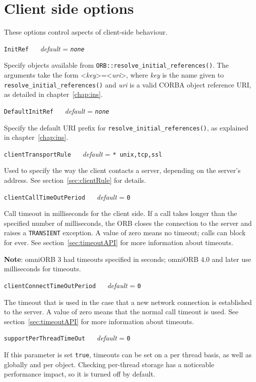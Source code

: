 \documentclass[11pt,oneside,a4paper]{book}
\makeatletter
\newcommand{\code}[1]{\texttt{#1}}
\newcommand{\op}[1]{\texttt{#1()}}
\newcommand{\confopt}[2]
  {\vspace{\baselineskip}\par\noindent\code{#1} ~~ \textit{default} =
   \code{#2}}
\renewcommand{\confopt}[2]
  {\vspace{\baselineskip}\par\noindent\code{#1} ~~ \textit{default} =
   \code{#2}\\[-1ex]\@afterheading}
\newcommand{\dsc}{\discretionary{}{}{}}
\makeatother
\begin{document}
\section{Client side options}
\label{sec:clientconf}

These options control aspects of client-side behaviour.


\confopt{InitRef}{\textit{none}}

Specify objects available from
\op{ORB::resolve\_initial\_references}. The arguments take the form
<\textit{key}>=<\textit{uri}>, where \textit{key} is the name given to
\op{resolve\_\dsc{}initial\_\dsc{}references} and \textit{uri} is a
valid CORBA object reference URI, as detailed in
chapter~\ref{chap:ins}.


\confopt{DefaultInitRef}{\textit{none}}

Specify the default URI prefix for
\op{resolve\_\dsc{}initial\_\dsc{}references}, as explained in
chapter~\ref{chap:ins}.


\confopt{clientTransportRule}{* unix,tcp,ssl}

Used to specify the way the client contacts a server, depending on the
server's address. See section~\ref{sec:clientRule} for details.


\confopt{clientCallTimeOutPeriod}{0}

Call timeout in milliseconds for the client side. If a call takes
longer than the specified number of milliseconds, the ORB closes the
connection to the server and raises a \code{TRANSIENT} exception. A
value of zero means no timeout; calls can block for ever. See
section~\ref{sec:timeoutAPI} for more information about timeouts.

\vspace{.5\baselineskip}

\noindent\textbf{Note}: omniORB 3 had timeouts specified in seconds;
omniORB 4.0 and later use milliseconds for timeouts.


\confopt{clientConnectTimeOutPeriod}{0}

The timeout that is used in the case that a new network connection is
established to the server. A value of zero means that the normal call
timeout is used. See section~\ref{sec:timeoutAPI} for more information
about timeouts.


\confopt{supportPerThreadTimeOut}{0}

If this parameter is set \code{true}, timeouts can be set on a per
thread basis, as well as globally and per object. Checking per-thread
storage has a noticeable performance impact, so it is turned off by
default.
\end{document}
